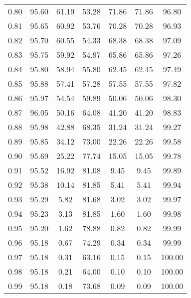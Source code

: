 \begin{tabular}{|c|c|c|c|c|c|c|}
      0.80 &     95.60 &     61.19 &      53.28 &   71.86 &      71.86 &         96.80 \\
      0.81 &     95.65 &     60.92 &      53.76 &   70.28 &      70.28 &         96.93 \\
      0.82 &     95.70 &     60.55 &      54.33 &   68.38 &      68.38 &         97.09 \\
      0.83 &     95.75 &     59.92 &      54.97 &   65.86 &      65.86 &         97.26 \\
      0.84 &     95.80 &     58.94 &      55.80 &   62.45 &      62.45 &         97.49 \\
      0.85 &     95.88 &     57.41 &      57.28 &   57.55 &      57.55 &         97.82 \\
      0.86 &     95.97 &     54.54 &      59.89 &   50.06 &      50.06 &         98.30 \\
      0.87 &     96.05 &     50.16 &      64.08 &   41.20 &      41.20 &         98.83 \\
      0.88 &     95.98 &     42.88 &      68.35 &   31.24 &      31.24 &         99.27 \\
      0.89 &     95.85 &     34.12 &      73.00 &   22.26 &      22.26 &         99.58 \\
      0.90 &     95.69 &     25.22 &      77.74 &   15.05 &      15.05 &         99.78 \\
      0.91 &     95.52 &     16.92 &      81.08 &    9.45 &       9.45 &         99.89 \\
      0.92 &     95.38 &     10.14 &      81.85 &    5.41 &       5.41 &         99.94 \\
      0.93 &     95.29 &      5.82 &      81.68 &    3.02 &       3.02 &         99.97 \\
      0.94 &     95.23 &      3.13 &      81.85 &    1.60 &       1.60 &         99.98 \\
      0.95 &     95.20 &      1.62 &      78.88 &    0.82 &       0.82 &         99.99 \\
      0.96 &     95.18 &      0.67 &      74.29 &    0.34 &       0.34 &         99.99 \\
      0.97 &     95.18 &      0.31 &      63.16 &    0.15 &       0.15 &        100.00 \\
      0.98 &     95.18 &      0.21 &      64.00 &    0.10 &       0.10 &        100.00 \\
      0.99 &     95.18 &      0.18 &      73.68 &    0.09 &       0.09 &        100.00 \\
\bottomrule
\end{tabular}
